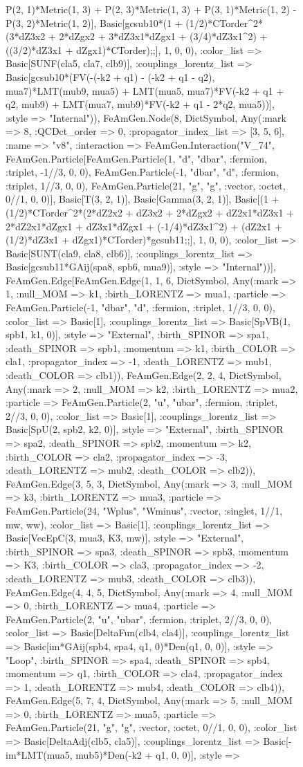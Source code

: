 \documentclass{revtex4}
\begin{document}
\begin{figure}[!htb]
\begin{center}
{P(2, 1)*Metric(1, 3) + P(2, 3)*Metric(1, 3) + P(3, 1)*Metric(1, 2) - P(3, 2)*Metric(1, 2)], Basic[gcsub10*(1 + (1/2)*CTorder^2*(3*dZ3x2 + 2*dZgx2 + 3*dZ3x1*dZgx1 + (3/4)*dZ3x1^2) + ((3/2)*dZ3x1 + dZgx1)*CTorder);;], 1, 0, 0), :color_list => Basic[SUNF(cla5, cla7, clb9)], :couplings_lorentz_list => Basic[gcsub10*(FV(-(-k2 + q1) - (-k2 + q1 - q2), mua7)*LMT(mub9, mua5) + LMT(mua5, mua7)*FV(-k2 + q1 + q2, mub9) + LMT(mua7, mub9)*FV(-k2 + q1 - 2*q2, mua5))], :style => "Internal")), FeAmGen.Node(8, Dict{Symbol, Any}(:mark => 8, :QCDct_order => 0, :propagator_index_list => [3, 5, 6], :name => "v8", :interaction => FeAmGen.Interaction("V_74", FeAmGen.Particle[FeAmGen.Particle(1, "d", "dbar", :fermion, :triplet, -1//3, 0, 0), FeAmGen.Particle(-1, "dbar", "d", :fermion, :triplet, 1//3, 0, 0), FeAmGen.Particle(21, "g", "g", :vector, :octet, 0//1, 0, 0)], Basic[T(3, 2, 1)], Basic[Gamma(3, 2, 1)], Basic[(1 + (1/2)*CTorder^2*(2*dZ2x2 + dZ3x2 + 2*dZgx2 + dZ2x1*dZ3x1 + 2*dZ2x1*dZgx1 + dZ3x1*dZgx1 + (-1/4)*dZ3x1^2) + (dZ2x1 + (1/2)*dZ3x1 + dZgx1)*CTorder)*gcsub11;;], 1, 0, 0), :color_list => Basic[SUNT(cla9, cla8, clb6)], :couplings_lorentz_list => Basic[gcsub11*GAij(spa8, spb6, mua9)], :style => "Internal"))], FeAmGen.Edge[FeAmGen.Edge(1, 1, 6, Dict{Symbol, Any}(:mark => 1, :null_MOM => k1, :birth_LORENTZ => mua1, :particle => FeAmGen.Particle(-1, "dbar", "d", :fermion, :triplet, 1//3, 0, 0), :color_list => Basic[1], :couplings_lorentz_list => Basic[SpVB(1, spb1, k1, 0)], :style => "External", :birth_SPINOR => spa1, :death_SPINOR => spb1, :momentum => k1, :birth_COLOR => cla1, :propagator_index => -1, :death_LORENTZ => mub1, :death_COLOR => clb1)), FeAmGen.Edge(2, 2, 4, Dict{Symbol, Any}(:mark => 2, :null_MOM => k2, :birth_LORENTZ => mua2, :particle => FeAmGen.Particle(2, "u", "ubar", :fermion, :triplet, 2//3, 0, 0), :color_list => Basic[1], :couplings_lorentz_list => Basic[SpU(2, spb2, k2, 0)], :style => "External", :birth_SPINOR => spa2, :death_SPINOR => spb2, :momentum => k2, :birth_COLOR => cla2, :propagator_index => -3, :death_LORENTZ => mub2, :death_COLOR => clb2)), FeAmGen.Edge(3, 5, 3, Dict{Symbol, Any}(:mark => 3, :null_MOM => k3, :birth_LORENTZ => mua3, :particle => FeAmGen.Particle(24, "Wplus", "Wminus", :vector, :singlet, 1//1, mw, ww), :color_list => Basic[1], :couplings_lorentz_list => Basic[VecEpC(3, mua3, K3, mw)], :style => "External", :birth_SPINOR => spa3, :death_SPINOR => spb3, :momentum => K3, :birth_COLOR => cla3, :propagator_index => -2, :death_LORENTZ => mub3, :death_COLOR => clb3)), FeAmGen.Edge(4, 4, 5, Dict{Symbol, Any}(:mark => 4, :null_MOM => 0, :birth_LORENTZ => mua4, :particle => FeAmGen.Particle(2, "u", "ubar", :fermion, :triplet, 2//3, 0, 0), :color_list => Basic[DeltaFun(clb4, cla4)], :couplings_lorentz_list => Basic[im*GAij(spb4, spa4, q1, 0)*Den(q1, 0, 0)], :style => "Loop", :birth_SPINOR => spa4, :death_SPINOR => spb4, :momentum => q1, :birth_COLOR => cla4, :propagator_index => 1, :death_LORENTZ => mub4, :death_COLOR => clb4)), FeAmGen.Edge(5, 7, 4, Dict{Symbol, Any}(:mark => 5, :null_MOM => 0, :birth_LORENTZ => mua5, :particle => FeAmGen.Particle(21, "g", "g", :vector, :octet, 0//1, 0, 0), :color_list => Basic[DeltaAdj(clb5, cla5)], :couplings_lorentz_list => Basic[-im*LMT(mua5, mub5)*Den(-k2 + q1, 0, 0)], :style => }
\end{center}
\end{figure}
\end{document}
